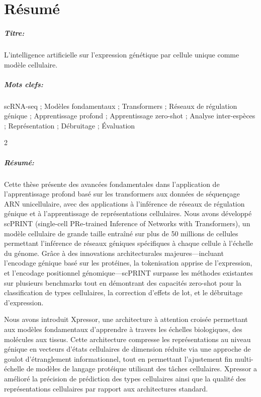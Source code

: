 \chapter*{Résumé}

\begin{mdframed}
\vspace{-.25cm}
\paragraph*{Titre:} L'intelligence artificielle sur l'expression génétique par cellule unique comme modèle cellulaire.

\begin{small}
\vspace{-.25cm}
\paragraph*{Mots clefs:} scRNA-seq ; Modèles fondamentaux ; Transformers ; Réseaux de régulation génique ; Apprentissage profond ; Apprentissage zero-shot ; Analyse inter-espèces ; Représentation ; Débruitage ; Évaluation

\vspace{-.5cm}
\setlength{\columnsep}{12pt}
\begin{multicols}{2}
\paragraph*{Résumé:} Cette thèse présente des avancées fondamentales dans l'application de l'apprentissage profond basé sur les transformers aux données de séquençage ARN unicellulaire, avec des applications à l'inférence de réseaux de régulation génique et à l'apprentissage de représentations cellulaires. Nous avons développé scPRINT (single-cell PRe-trained Inference of Networks with Transformers), un modèle cellulaire de grande taille entraîné sur plus de 50 millions de cellules permettant l'inférence de réseaux géniques spécifiques à chaque cellule à l'échelle du génome. Grâce à des innovations architecturales majeures—incluant l'encodage génique basé sur les protéines, la tokenisation apprise de l'expression, et l'encodage positionnel génomique—scPRINT surpasse les méthodes existantes sur plusieurs benchmarks tout en démontrant des capacités zero-shot pour la classification de types cellulaires, la correction d'effets de lot, et le débruitage d'expression.

Nous avons introduit Xpressor, une architecture à attention croisée permettant aux modèles fondamentaux d'apprendre à travers les échelles biologiques, des molécules aux tissus. Cette architecture compresse les représentations au niveau génique en vecteurs d'états cellulaires de dimension réduite via une approche de goulot d'étranglement informationnel, tout en permettant l'ajustement fin multi-échelle de modèles de langage protéique utilisant des tâches cellulaires. Xpressor a amélioré la précision de prédiction des types cellulaires ainsi que la qualité des représentations cellulaires par rapport aux architectures standard.


\end{multicols}
\end{small}
\end{mdframed}
